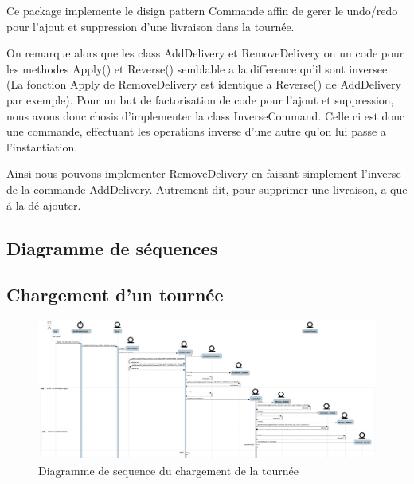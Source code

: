 Ce package implemente le disign pattern Commande affin de gerer le undo/redo pour l'ajout et
suppression d'une livraison dans la tourn\'ee.

On remarque alors que les class AddDelivery et
RemoveDelivery on un code pour les methodes Apply() et Reverse() semblable a la difference
qu'il sont inversee (La fonction Apply de RemoveDelivery est identique a Reverse() de
AddDelivery par exemple). Pour un but de factorisation de code pour l'ajout
et suppression, nous avons donc chosis d'implementer la class InverseCommand. Celle ci est donc une
commande, effectuant les operations inverse d'une autre qu'on lui passe a l'instantiation.

Ainsi nous pouvons implementer RemoveDelivery en faisant simplement l'inverse de la commande
AddDelivery. Autrement dit, pour supprimer une livraison, a que \'a la d\'e-ajouter.



\begin{landscape}
    \section{Diagramme de s\'equences}

    \subsection{Chargement d'un tourn\'ee}

    \begin{figure}[h]
        \centering
        \includegraphics[width=240mm]{../diagrams/sequences/loadRound.png}
        \caption{Diagramme de sequence du chargement de la tourn\'ee}
        \label{diagram:seq_load_round}
    \end{figure}
\end{landscape}
\pagebreak

